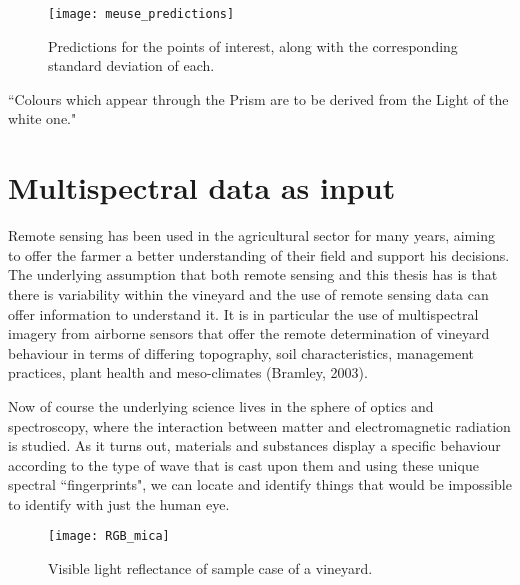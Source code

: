 \documentclass[12pt,a4paper,oneside]{book}
\theoremstyle{plain}
\theoremstyle{definition}
\begin{document}
{\begin{figure}[h]
\begin{center}
\texttt{[image: meuse\_predictions]}
\end{center}
\caption{Predictions for the points of interest, along with the corresponding standard deviation of each.}
\end{figure}

\begin{savequote}[60mm] 
``Colours which appear through the Prism are to be derived from the Light of the white one."
\end{savequote}
\chapter{Multispectral data as input 
}
Remote sensing has been used in the agricultural sector for many years, aiming to offer the farmer a better understanding of their field and support his decisions. The underlying assumption that both remote sensing and this thesis has is that there is variability within the vineyard and the 
use of remote sensing data can offer information to understand it. It is in particular the use of multispectral imagery from airborne sensors that offer the remote determination of vineyard behaviour in terms of differing topography, soil characteristics, management practices, plant health and meso-climates (Bramley, 2003). 

\vspace{3mm}
\noindent
Now of course the underlying science lives in the sphere of optics and spectroscopy, where the interaction between matter and electromagnetic radiation is studied. As it turns out, materials and substances display a specific behaviour according to the type of wave that is cast upon them and using these unique spectral ``fingerprints", we can locate and identify things that would be impossible to identify with just the human eye.

\begin{figure}[h]
\begin{center}
\texttt{[image: RGB\_mica]}
\caption{Visible light reflectance of sample case of a vineyard.}
\end{center}
\end{figure}

}
\end{document}
